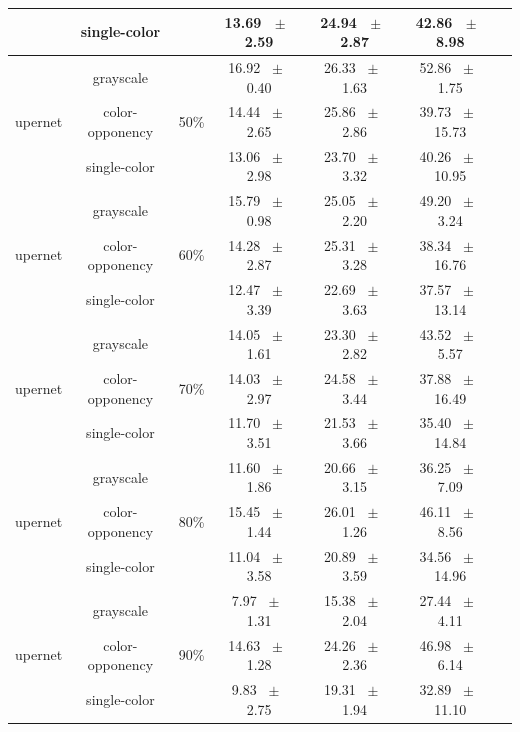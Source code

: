\begin{table}[h]
\begin{tabular}{@{}lccc ccc@{}}
    & single-color &  & 13.69 ~$\pm$~ 2.59 & 24.94 ~$\pm$~ 2.87 & 42.86 ~$\pm$~ 8.98 \\
    \midrule
    \multirow{3}{*}{upernet} & grayscale & \multirow{3}{*}{50\%} & 16.92 ~$\pm$~ 0.40 & 26.33 ~$\pm$~ 1.63 & 52.86 ~$\pm$~ 1.75 \\
    & color-opponency &  & 14.44 ~$\pm$~ 2.65 & 25.86 ~$\pm$~ 2.86 & 39.73 ~$\pm$~ 15.73 \\
    & single-color &  & 13.06 ~$\pm$~ 2.98 & 23.70 ~$\pm$~ 3.32 & 40.26 ~$\pm$~ 10.95 \\
    \midrule
    \multirow{3}{*}{upernet} & grayscale & \multirow{3}{*}{60\%} & 15.79 ~$\pm$~ 0.98 & 25.05 ~$\pm$~ 2.20 & 49.20 ~$\pm$~ 3.24 \\
    & color-opponency &  & 14.28 ~$\pm$~ 2.87 & 25.31 ~$\pm$~ 3.28 & 38.34 ~$\pm$~ 16.76 \\
    & single-color &  & 12.47 ~$\pm$~ 3.39 & 22.69 ~$\pm$~ 3.63 & 37.57 ~$\pm$~ 13.14 \\
    \midrule
    \multirow{3}{*}{upernet} & grayscale & \multirow{3}{*}{70\%} & 14.05 ~$\pm$~ 1.61 & 23.30 ~$\pm$~ 2.82 & 43.52 ~$\pm$~ 5.57 \\
    & color-opponency &  & 14.03 ~$\pm$~ 2.97 & 24.58 ~$\pm$~ 3.44 & 37.88 ~$\pm$~ 16.49 \\
    & single-color &  & 11.70 ~$\pm$~ 3.51 & 21.53 ~$\pm$~ 3.66 & 35.40 ~$\pm$~ 14.84 \\
    \midrule
    \multirow{3}{*}{upernet} & grayscale & \multirow{3}{*}{80\%} & 11.60 ~$\pm$~ 1.86 & 20.66 ~$\pm$~ 3.15 & 36.25 ~$\pm$~ 7.09 \\
    & color-opponency &  & 15.45 ~$\pm$~ 1.44 & 26.01 ~$\pm$~ 1.26 & 46.11 ~$\pm$~ 8.56 \\
    & single-color &  & 11.04 ~$\pm$~ 3.58 & 20.89 ~$\pm$~ 3.59 & 34.56 ~$\pm$~ 14.96 \\
    \midrule
    \multirow{3}{*}{upernet} & grayscale & \multirow{3}{*}{90\%} & 7.97 ~$\pm$~ 1.31 & 15.38 ~$\pm$~ 2.04 & 27.44 ~$\pm$~ 4.11 \\
    & color-opponency &  & 14.63 ~$\pm$~ 1.28 & 24.26 ~$\pm$~ 2.36 & 46.98 ~$\pm$~ 6.14 \\
    & single-color &  & 9.83 ~$\pm$~ 2.75 & 19.31 ~$\pm$~ 1.94 & 32.89 ~$\pm$~ 11.10 \\
    \midrule
    \bottomrule
  \end{tabular}
  \label{tab:sparse_results_upernet_acdc_night}
\end{table}